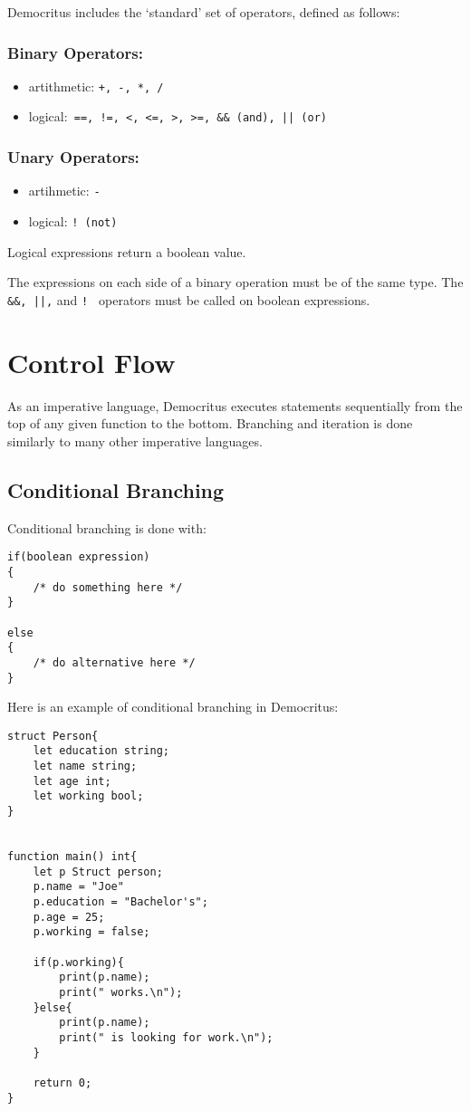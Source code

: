 		Democritus includes the `standard' set of operators, defined as follows:

		\subsubsection{Binary Operators:}
		\begin{itemize}
			\item artithmetic: \texttt{+, -, *, /}
			\item logical:\verb^ ==, !=, <, <=, >, >=, && (and), || (or) ^ 
		\end{itemize}

		\subsubsection{Unary Operators:}
		\begin{itemize}
			\item artihmetic: \texttt{-}
			\item logical: \texttt{! (not)}
		\end{itemize}

		\noindent
		Logical expressions return a boolean value.

		\medskip \noindent
		The expressions on each side of a binary operation must be of the same type. The \verb^ &&, ||,^ and \verb^! ^ operators must be called on boolean expressions.


\section{Control Flow}
	As an imperative language, Democritus executes statements sequentially from the top of any given function to the bottom. Branching and iteration is done similarly to many other imperative languages.

	\subsection{Conditional Branching}
		Conditional branching is done with:

		\begin{lstlisting}
if(boolean expression) 
{ 
	/* do something here */
}

else
{
	/* do alternative here */
}
		\end{lstlisting}
	
		\medskip \noindent
		Here is an example of conditional branching in Democritus:

		\begin{lstlisting}
struct Person{
	let education string;
	let name string;
	let age int;
	let working bool;
}


function main() int{
	let p Struct person;
	p.name = "Joe"
	p.education = "Bachelor's";
	p.age = 25;
	p.working = false;

	if(p.working){
		print(p.name);
		print(" works.\n");
	}else{
		print(p.name);
		print(" is looking for work.\n");
	}

	return 0;
}
		\end{lstlisting}

